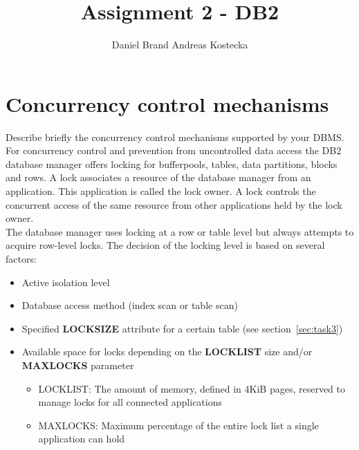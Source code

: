\documentclass{vldb}
\begin{document}

\title{Assignment 2 - DB2}



\author{
\alignauthor Daniel Brand
\alignauthor Andreas Kostecka
}


\maketitle

\section{Concurrency control mechanisms}

Describe briefly the concurrency control mechanisms supported by your DBMS.\\

For concurrency control and prevention from uncontrolled data access the DB2 database manager offers locking for bufferpools, tables, data partitions,
blocks and rows. A lock associates a resource of the database manager from an application. This application is called the lock owner.  A lock controls the 
concurrent access of the same resource from other applications held by the lock owner.\\


The database manager uses locking at a row or table level but always attempts to acquire row-level locks.
The decision of the locking level is based on several factors:
\begin{itemize}
\item Active isolation level 
\item Database access method (index scan or table scan)
\item Specified \textbf{LOCKSIZE} attribute for a certain table
(see section~\ref{sec:task3})
\item Available space for locks depending on the \textbf{LOCKLIST} size and/or \textbf{MAXLOCKS} parameter
\begin{itemize}
\item LOCKLIST: The amount of memory, defined in 4KiB pages, reserved to manage locks for all
connected applications
\item MAXLOCKS: Maximum percentage of the entire lock list a single application can hold
\end{itemize}
\end{itemize}
\end{document}
